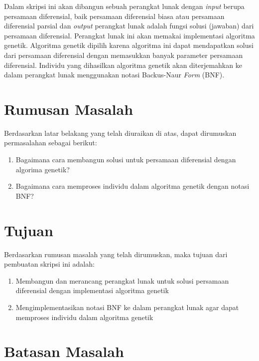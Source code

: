 Dalam skripsi ini akan dibangun sebuah perangkat lunak dengan \textit{input} berupa persamaan diferensial, baik persamaan diferensial biasa atau persamaan diferensial parsial dan \textit{output} perangkat lunak adalah fungsi solusi (jawaban) dari persamaan diferensial. Perangkat lunak ini akan memakai implementasi algoritma genetik. Algoritma genetik dipilih karena algoritma ini dapat mendapatkan solusi dari persamaan diferensial dengan memasukkan banyak parameter persamaan diferensial. Individu yang dihasilkan algoritma genetik  akan diterjemahkan ke dalam perangkat lunak menggunakan notasi Backus-Naur \textit{Form} (BNF).

\section{Rumusan Masalah}
\label{sec:rumusan}

Berdasarkan latar belakang yang telah diuraikan di atas, dapat dirumuskan permasalahan sebagai berikut:

\begin{enumerate}

\item Bagaimana cara membangun solusi untuk persamaan diferensial dengan algorima genetik?
\item Bagaimana cara memproses individu dalam algoritma genetik dengan notasi BNF?

\end{enumerate}

\section{Tujuan}
\label{sec:tujuan}

Berdasarkan rumusan masalah yang telah dirumuskan, maka tujuan dari pembuatan skripsi ini adalah:

\begin{enumerate}

\item Membangun dan merancang perangkat lunak untuk solusi persamaan diferensial dengan implementasi algoritma genetik
\item Mengimplementasikan notasi BNF ke dalam perangkat lunak agar dapat memproses individu dalam algoritma genetik

\end{enumerate}

\section{Batasan Masalah}
\label{sec:batasan}

